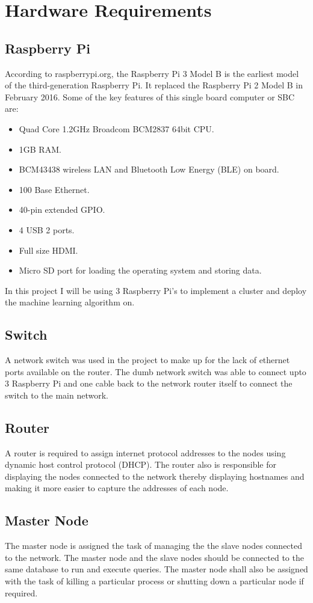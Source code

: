 \documentclass[12pt]{article}
\begin{document}
\newpage
\section{Hardware Requirements}
\subsection{Raspberry Pi}

According to raspberrypi.org, the Raspberry Pi 3 Model B is the earliest model of the third-generation Raspberry Pi. It replaced the Raspberry Pi 2 Model B in February 2016. Some of the key features of this single board computer or SBC are:
\begin{itemize}
\item Quad Core 1.2GHz Broadcom BCM2837 64bit CPU.
\item 1GB RAM.
\item BCM43438 wireless LAN and Bluetooth Low Energy (BLE) on board.
\item 100 Base Ethernet.
\item 40-pin extended GPIO.
\item 4 USB 2 ports.
\item Full size HDMI.
\item Micro SD port for loading the operating system and storing data.
\end{itemize}
In this project I will be using 3 Raspberry Pi's to implement a cluster and deploy the machine learning algorithm on.

\subsection{Switch}
A network switch was used in the project to make up for the lack of ethernet ports available on the router. The dumb network switch 
was able to connect upto 3 Raspberry Pi and one cable back to the network router itself to connect the switch to the main network.

\subsection{Router}
A router is required to assign internet protocol addresses to the nodes using dynamic host control protocol (DHCP). The router also is responsible for displaying the nodes connected to the network thereby displaying hostnames and making it more easier to capture the addresses of each node.

\subsection{Master Node}
The master node is assigned the task of managing the the slave nodes connected to the network. The master node and the slave nodes should be connected to the same database to run and execute queries. The master node shall also be assigned with the task of killing a particular process or shutting down a particular node if required.
\end{document}
